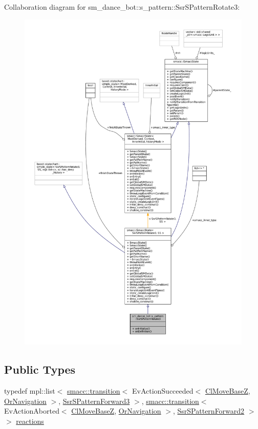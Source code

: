 Collaboration diagram for sm\+\_\+dance\+\_\+bot\+:\+:s\+\_\+pattern\+:\+:Ssr\+S\+Pattern\+Rotate3\+:
\nopagebreak
\begin{figure}[H]
\begin{center}
\leavevmode
\includegraphics[width=350pt]{structsm__dance__bot_1_1s__pattern_1_1SsrSPatternRotate3__coll__graph}
\end{center}
\end{figure}
\subsection*{Public Types}
\begin{DoxyCompactItemize}
\item 
typedef mpl\+::list$<$ \hyperlink{classsmacc_1_1transition}{smacc\+::transition}$<$ Ev\+Action\+Succeeded$<$ \hyperlink{classmove__base__z__client_1_1ClMoveBaseZ}{Cl\+Move\+BaseZ}, \hyperlink{classsm__dance__bot_1_1OrNavigation}{Or\+Navigation} $>$, \hyperlink{structsm__dance__bot_1_1s__pattern_1_1SsrSPatternForward3}{Ssr\+S\+Pattern\+Forward3} $>$, \hyperlink{classsmacc_1_1transition}{smacc\+::transition}$<$ Ev\+Action\+Aborted$<$ \hyperlink{classmove__base__z__client_1_1ClMoveBaseZ}{Cl\+Move\+BaseZ}, \hyperlink{classsm__dance__bot_1_1OrNavigation}{Or\+Navigation} $>$, \hyperlink{structsm__dance__bot_1_1s__pattern_1_1SsrSPatternForward2}{Ssr\+S\+Pattern\+Forward2} $>$ $>$ \hyperlink{structsm__dance__bot_1_1s__pattern_1_1SsrSPatternRotate3_adfa0a5717a6bd1f595ebaef94265741d}{reactions}
\end{DoxyCompactItemize}
